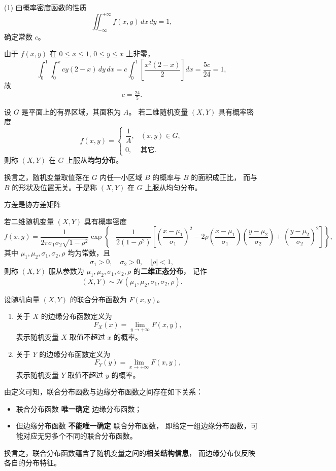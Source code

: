 \begin{solution}
(1) 由概率密度函数的性质
\[
\iint_{-\infty}^{+\infty} f(x,y)\,dx\,dy = 1,
\]
确定常数 $c$。

由于 $f(x,y)$ 在 $0\le x\le 1,\,0\le y\le x$ 上非零，
\[
\int_0^1\!\!\int_0^x cy(2-x)\,dy\,dx
= c\!\int_0^1 \!\left[\frac{x^2(2-x)}{2}\right]dx
= \frac{5c}{24} = 1,
\]
故
\[
\boxed{c = \tfrac{24}{5}}.
\]
\end{solution}
\begin{proposition}[均匀分布]
设 $G$ 是平面上的有界区域，其面积为 $A$。  
若二维随机变量 $(X,Y)$ 具有概率密度
\[
f(x,y)=
\begin{cases}
\dfrac{1}{A}, & (x,y)\in G,\\[6pt]
0, & \text{其它.}
\end{cases}
\]
则称 $(X,Y)$ 在 $G$ 上服从\textbf{均匀分布}。

换言之，随机变量取值落在 $G$ 内任一小区域 $B$ 的概率与 $B$ 的面积成正比，  
而与 $B$ 的形状及位置无关。于是称 $(X,Y)$ 在 $G$ 上服从均匀分布。
\end{proposition}
方差是协方差矩阵
\begin{proposition}[正态分布]
若二维随机变量 $(X,Y)$ 具有概率密度
\[
f(x,y)=
\frac{1}{2\pi\sigma_1\sigma_2\sqrt{1-\rho^2}}
\exp\!\left\{
-\frac{1}{2(1-\rho^2)}
\!\left[
\left(\frac{x-\mu_1}{\sigma_1}\right)^2
-2\rho\!\left(\frac{x-\mu_1}{\sigma_1}\right)\!\left(\frac{y-\mu_2}{\sigma_2}\right)
+\left(\frac{y-\mu_2}{\sigma_2}\right)^2
\right]
\right\},
\]
其中 $\mu_1,\mu_2,\sigma_1,\sigma_2,\rho$ 均为常数，且
\[
\sigma_1>0,\quad \sigma_2>0,\quad |\rho|<1,
\]
则称 $(X,Y)$ 服从参数为 $\mu_1,\mu_2,\sigma_1,\sigma_2,\rho$ 的\textbf{二维正态分布}，  
记作
\[
(X,Y)\sim \mathcal{N}(\mu_1,\mu_2,\sigma_1,\sigma_2,\rho).
\]
\end{proposition}
\begin{proposition}[边缘分布函数]
设随机向量 $(X,Y)$ 的联合分布函数为 $F(x,y)$。

\begin{enumerate}[(1)]
\item 关于 $X$ 的边缘分布函数定义为
\[
F_X(x)=\lim_{y\to +\infty} F(x,y),
\]
表示随机变量 $X$ 取值不超过 $x$ 的概率。

\item 关于 $Y$ 的边缘分布函数定义为
\[
F_Y(y)=\lim_{x\to +\infty} F(x,y),
\]
表示随机变量 $Y$ 取值不超过 $y$ 的概率。
\end{enumerate}

\noindent
由定义可知，联合分布函数与边缘分布函数之间存在如下关系：

\begin{itemize}
  \item 联合分布函数 \textbf{唯一确定} 边缘分布函数；
  \item 但边缘分布函数 \textbf{不能唯一确定} 联合分布函数，  
  即给定一组边缘分布函数，可能对应无穷多个不同的联合分布函数。
\end{itemize}

\noindent
换言之，联合分布函数蕴含了随机变量之间的\textbf{相关结构信息}，  
而边缘分布仅反映各自的分布特征。
\end{proposition}
